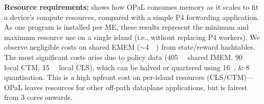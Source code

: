 \documentclass[
sigconf,natbib=false
,anonymous=true
,10pt
]{acmart}
\newcommand{\fakepara}[1]{\noindent\textbf{#1:}}
\newcommand{\approachshort}{OPaL}
\newcommand{\Coopfw}{\emph{CoOp}}
\newcommand{\Indfw}{\emph{Ind}}
\begin{document}
\fakepara{Resource requirements}
 shows how \approachshort{} consumes memory as it scales to fit a device's compute resources, compared with a simple P4 forwarding application.
As one program is installed per ME, these results represent the minimum and maximum resource use on a single island (i.e., without replacing P4 workers).
We observe negligible costs on shared EMEM ($\sim$\SI{4}{\mebi\byte}) from state/reward hashtables.
The most significant costs arise due to policy data (\SI{405}{\kibi\byte} shared IMEM, \SI{90}{\kibi\byte} local CTM, \SI{15}{\kibi\byte} local CLS), which can be halved or quartered using \SIlist{16;8}{\bit} quantisation.
This is a high upfront cost on per-island resources (CLS/CTM)---\approachshort{} leaves resources for other off-path dataplane applications, but is fairest from 3 cores onwards.

\end{document}
